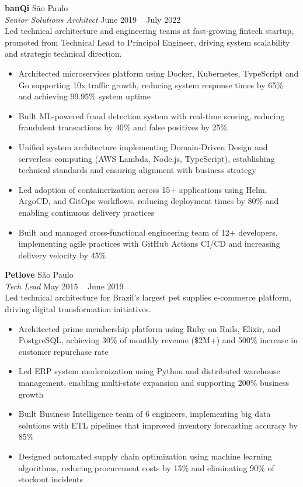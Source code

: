 \documentclass[a4paper]{article}
\begin{document}
\textbf{banQi}                                 \hfill São Paulo             \\
\textit{Senior Solutions Architect}            \hfill June 2019 ~ July 2022   \\
\vspace{0.5mm}
Led technical architecture and engineering teams at fast-growing fintech startup, promoted from Technical Lead to Principal Engineer, driving system scalability and strategic technical direction.
\vspace{-2mm}
\begin{itemize}
\setlength\itemsep{-1mm}
\item Architected microservices platform using Docker, Kubernetes, TypeScript and Go supporting 10x traffic growth, reducing system response times by 65\% and achieving 99.95\% system uptime
\item Built ML-powered fraud detection system with real-time scoring, reducing fraudulent transactions by 40\% and false positives by 25\%
\item Unified system architecture implementing Domain-Driven Design and serverless computing (AWS Lambda, Node.js, TypeScript), establishing technical standards and ensuring alignment with business strategy
\item Led adoption of containerization across 15+ applications using Helm, ArgoCD, and GitOps workflows, reducing deployment times by 80\% and enabling continuous delivery practices
\item Built and managed cross-functional engineering team of 12+ developers, implementing agile practices with GitHub Actions CI/CD and increasing delivery velocity by 45\%
\end{itemize}

\textbf{Petlove}                               \hfill São Paulo             \\
\textit{Tech Lead}                             \hfill May 2015 ~ June 2019   \\
\vspace{0.5mm}
Led technical architecture for Brazil's largest pet supplies e-commerce platform, driving digital transformation initiatives.
\vspace{-2mm}
\begin{itemize}
\setlength\itemsep{-1mm}
\item Architected prime membership platform using Ruby on Rails, Elixir, and PostgreSQL, achieving 30\% of monthly revenue (\$2M+) and 500\% increase in customer repurchase rate
\item Led ERP system modernization using Python and distributed warehouse management, enabling multi-state expansion and supporting 200\% business growth
\item Built Business Intelligence team of 6 engineers, implementing big data solutions with ETL pipelines that improved inventory forecasting accuracy by 85\%
\item Designed automated supply chain optimization using machine learning algorithms, reducing procurement costs by 15\% and eliminating 90\% of stockout incidents
\end{itemize}
\end{document}
